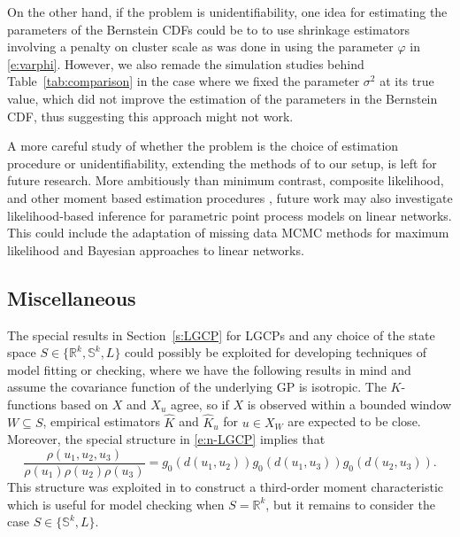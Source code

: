 \documentclass[alpha-refs]{wiley-article}
\begin{document}
On the other hand, if the problem is unidentifiability, one idea for estimating the parameters of the Bernstein CDFs could be to  
to use shrinkage estimators involving a penalty on cluster scale as was done in \citet{BadEtAl2022} using the parameter $\varphi$ in \eqref{e:varphi}.
However, we also remade the simulation studies behind Table~\ref{tab:comparison} in the case where we fixed the parameter $\sigma^2$ at its true value, which did not improve the estimation of the parameters in the Bernstein CDF, thus suggesting this approach might not work.

A more careful study of whether the problem is the choice of estimation procedure or unidentifiability, extending 
the methods of \citet{BadEtAl2022} to our setup, is left for future research. 
More ambitiously than minimum contrast, composite likelihood, and other moment based estimation procedures \citep{MW17}, future work may also investigate likelihood-based inference for parametric point process models on linear networks. This could include the adaptation of missing data MCMC methods for maximum likelihood \citep{Geyer,MW04} and Bayesian approaches \citep{RueEtAl,GT} to linear networks. 

\subsection{Miscellaneous}\label{s:7.4}
  
The special results in Section~\ref{s:LGCP} for LGCPs and any choice of the state space $S\in\{\mathbb R^k,\mathbb S^k,L\}$ could possibly be exploited for developing techniques of model fitting or checking, where we have the following results in mind and 
assume the covariance function of the underlying GP is isotropic. The $K$-functions based on $X$ and $X_u$ agree, so if $X$ is observed within a bounded window $W\subseteq S$, empirical estimators $\hat K$ and $\hat K_u$ for $u\in X_W$ are expected to be close. 
Moreover, the special structure in 
\eqref{e:n-LGCP} implies that 
\[\frac{\rho(u_1,u_2,u_3)}{\rho(u_1)\rho(u_2)\rho(u_3)}=g_0(d(u_1,u_2))g_0(d(u_1,u_3))g_0(d(u_2,u_3)).\]
This structure was exploited in \citet[][]{LGCP} to construct a third-order moment characteristic which is useful for model checking when $S=\mathbb R^k$, but it remains to consider the case $S\in\{\mathbb S^k,L\}$. %
\end{document}

